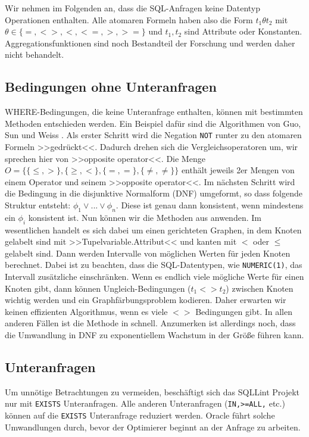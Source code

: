 Wir nehmen im Folgenden an, dass die SQL-Anfragen keine Datentyp Operationen enthalten. Alle atomaren Formeln haben also die Form $t_1\theta t_2$ mit $\theta\in \{=,<>,<,<=,>,>=\}$ und $t_1,t_2$ sind Attribute oder Konstanten. Aggregationsfunktionen sind noch Bestandteil der Forschung und werden daher nicht behandelt.

\subsection{Bedingungen ohne Unteranfragen}

WHERE-Bedingungen, die keine Unteranfrage enthalten, können mit bestimmten Methoden entschieden werden. Ein Beispiel dafür sind die Algorithmen von Guo, Sun und Weiss \cite{decideable1}. Als erster Schritt wird die Negation \verb|NOT| runter zu den atomaren Formeln >>gedrückt<<. Dadurch drehen sich die Vergleichsoperatoren um, wir sprechen hier von >>opposite operator<<. Die Menge $O=\{ \{\leq,>\} , \{\geq,<\} , \{ =, =\}, \{\neq,\neq\} \}$ enthält jeweils 2er Mengen von einem Operator und seinem >>opposite operator<<. Im nächsten Schritt wird die Bedingung in die disjunktive Normalform (DNF) umgeformt, so dass folgende Struktur entsteht: $\phi_1 \vee ... \vee \phi_n$. Diese ist genau dann konsistent, wenn mindestens ein $\phi_i$ konsistent ist. Nun können wir die Methoden aus \cite{decideable1} anwenden. Im wesentlichen handelt es sich dabei um einen gerichteten Graphen, in dem Knoten gelabelt sind mit >>Tupelvariable.Attribut<< und kanten mit $<$ oder $\leq$ gelabelt sind. Dann werden Intervalle von möglichen Werten für jeden Knoten berechnet. Dabei ist zu beachten, dass die SQL-Datentypen, wie \verb|NUMERIC(1)|, das Intervall zusätzliche einschränken.
Wenn es endlich viele mögliche Werte für einen Knoten gibt, dann können Ungleich-Bedingungen ($t_1<>t_2$) zwischen Knoten wichtig werden und ein Graphfärbungsproblem kodieren. Daher erwarten wir keinen effizienten Algorithmus, wenn es viele $<>$ Bedingungen gibt. In allen anderen Fällen ist die Methode in \cite{decideable1} schnell. Anzumerken ist allerdings noch, dass die Umwandlung in DNF zu exponentiellem Wachstum in der Größe führen kann.

\subsection{Unteranfragen}

Um unnötige Betrachtungen zu vermeiden, beschäftigt sich das SQLLint Projekt nur mit \verb|EXISTS| Unteranfragen. Alle anderen Unteranfragen (\verb|IN,>=ALL,| etc.) können auf die \verb|EXISTS| Unteranfrage reduziert werden. Oracle führt solche Umwandlungen durch, bevor der Optimierer beginnt an der Anfrage zu arbeiten.

